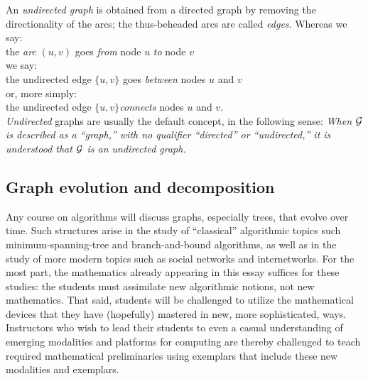An {\em undirected graph} is obtained from a directed graph by
removing the directionality of the arcs; the thus-beheaded arcs are
called {\em edges}.  Whereas we say: \\
\hspace*{.35in}the {\em arc} $(u,v)$ goes {\em from} node $u$ {\em to}
node $v$ \\
we say: \\
\hspace*{.35in}the undirected edge $\{u,v\}$ goes {\em between} nodes
$u$ and $v$ \\
or, more simply: \\
\hspace*{.35in}the undirected edge $\{u,v\}${\em connects} nodes $u$
and $v$.  \\
{\em Undirected} graphs are usually the default concept, in the
following sense: {\em When $\mbox{$\cal G$}$ is described as a ``graph,'' with no
  qualifier ``directed'' or ``undirected,'' it is understood that $\mbox{$\cal G$}$
  is an undirected graph.}


\subsection{Graph evolution and decomposition}

Any course on algorithms will discuss graphs, especially trees, that
evolve over time.  Such structures arise in the study of ``classical''
algorithmic topics such minimum-spanning-tree and branch-and-bound
algorithms, as well as in the study of more modern topics such as
social networks and internetworks.  For the most part, the mathematics
already appearing in this essay suffices for these studies: the students
must assimilate new algorithmic notions, not new mathematics.  That
said, students will be challenged to utilize the mathematical devices
that they have (hopefully) mastered in new, more sophisticated, ways.
Instructors who wish to lead their students to even a casual
understanding of emerging modalities and platforms for computing are
thereby challenged to teach required mathematical preliminaries using
exemplars that include these new modalities and exemplars.

